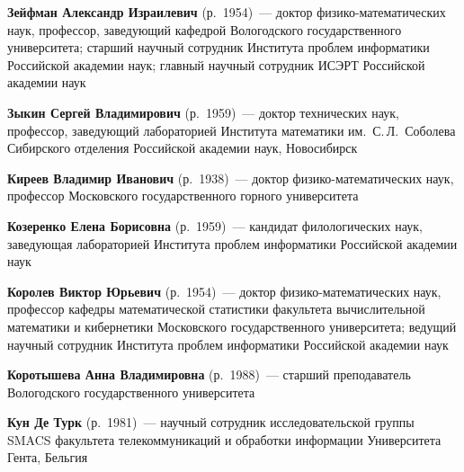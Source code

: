 \begin{multicols}{2}
\vspace*{3pt}

\noindent
\textbf{Зейфман Александр Израилевич} (р.\ 1954)~---
доктор фи\-зи\-ко-ма\-те\-ма\-ти\-че\-ских наук, профессор, 
заведующий кафедрой Вологодского государственного университета; 
старший научный сотрудник Института проб\-лем информатики
Российской академии наук; главный научный сотрудник ИСЭРТ Российской академии наук

\vspace*{3pt}

\noindent
\textbf{Зыкин Сергей Владимирович} (р.\ 1959)~--- 
доктор технических наук, профессор, заведующий лабораторией Института математики 
им.\ С.\,Л.~Соболева Сибирского отделения Российской академии наук, Новосибирск 

\vspace*{4pt}

\noindent
\textbf{Киреев Владимир Иванович} (р.\ 1938)~---
доктор фи\-зи\-ко-ма\-те\-ма\-ти\-че\-ских наук, профессор Московского 
государственного горного университета


\vspace*{4pt}

\noindent
\textbf{Козеренко Елена Борисовна} (р.\ 1959)~---
кандидат филологических наук, заведующая лабораторией Института проб\-лем информатики
Российской академии наук

\vspace*{4pt}

\noindent
\textbf{Королев Виктор Юрьевич} (р.\ 1954)~--- доктор
фи\-зи\-ко-ма\-те\-ма\-ти\-че\-ских наук, профессор кафедры математической 
статистики факультета вычисли\-тельной математики и кибернетики 
Московского государственного университета; 
ведущий научный сотрудник Института проб\-лем информатики
Российской академии наук

\vspace*{4pt}

\noindent
\textbf{Коротышева Анна Владимировна} (р.\ 1988)~---
старший преподаватель Вологодского государственного университета

\vspace*{4pt}

\noindent 
\textbf{Кун Де Турк} (р.\ 1981)~--- научный сотрудник 
исследовательской группы SMACS факультета телекоммуникаций и обработки информации
Университета Гента, Бельгия


\end{multicols}
